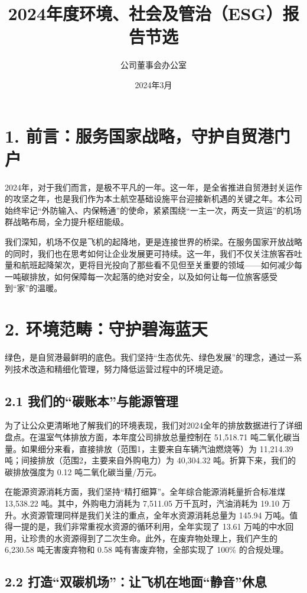 \documentclass[a4paper,12pt]{article}
\title{\textbf{2024年度环境、社会及管治（ESG）报告节选}}
\author{公司董事会办公室}
\date{2024年3月}
\begin{document}
\maketitle

\section{1. 前言：服务国家战略，守护自贸港门户}

2024年，对于我们而言，是极不平凡的一年。这一年，是全省推进自贸港封关运作的攻坚之年，也是我们作为本土航空基础设施平台迎接新机遇的关键之年。本公司始终牢记“外防输入、内保畅通”的使命，紧紧围绕“一主一次，两支一货运”的机场群战略布局，全力提升枢纽能级。

我们深知，机场不仅是飞机的起降地，更是连接世界的桥梁。在服务国家开放战略的同时，我们也在思考如何让企业发展更可持续。这一年，我们不仅关注旅客吞吐量和航班起降架次，更将目光投向了那些看不见但至关重要的领域——如何减少每一吨碳排放，如何保障每一次起落的绝对安全，以及如何让每一位旅客感受到“家”的温暖。

\section{2. 环境范畴：守护碧海蓝天}

绿色，是自贸港最鲜明的底色。我们坚持“生态优先、绿色发展”的理念，通过一系列技术改造和精细化管理，努力降低运营过程中的环境足迹。

\subsection{2.1 我们的“碳账本”与能源管理}

为了让公众更清晰地了解我们的环境表现，我们对2024全年的排放数据进行了详细盘点。在温室气体排放方面，本年度公司排放总量控制在 51,518.71 吨二氧化碳当量。如果细分来看，直接排放（范围1，主要来自车辆汽油燃烧等）为 11,214.39 吨；间接排放（范围2，主要来自外购电力）为 40,304.32 吨。折算下来，我们的碳排放强度为 0.12 吨二氧化碳当量/万元。

在能源资源消耗方面，我们坚持“精打细算”。全年综合能源消耗量折合标准煤 13,538.22 吨。其中，外购电力消耗为 7,511.05 万千瓦时，汽油消耗为 19.10 万升。水资源管理同样是我们关注的重点，全年水资源消耗总量为 145.94 万吨。值得一提的是，我们非常重视水资源的循环利用，全年实现了 13.61 万吨的中水回用，让珍贵的水资源得到了二次生命。此外，在废弃物处理上，我们产生的 6,230.58 吨无害废弃物和 0.58 吨有害废弃物，全部实现了 100\% 的合规处理。

\subsection{2.2 打造“双碳机场”：让飞机在地面“静音”休息}
\end{document}

